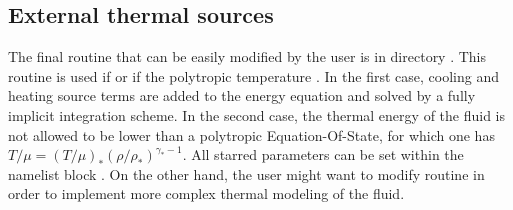 \subsection{External thermal sources}

The final routine that can be easily modified by the user is
 in directory . This routine is used if
 or if the polytropic temperature
. In the first case, cooling and heating source
terms are added to the energy equation and solved by a fully implicit
integration scheme. In the second case, the thermal energy of the fluid is not
allowed to be lower than a polytropic Equation-Of-State, for which one has $ T
/ \mu = {(T / \mu)}_{*} {(\rho / \rho_{*})}^{\gamma_{*}-1} $.  All starred
parameters can be set within the namelist block .
On the other hand, the user might want to modify routine
 in order to implement more complex thermal modeling of
the fluid.

